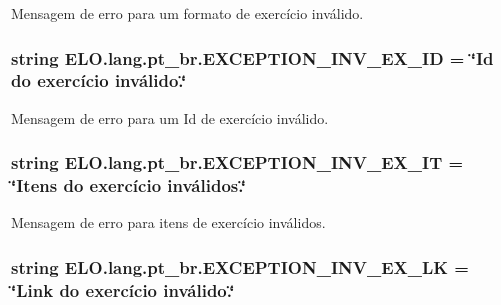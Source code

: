 Mensagem de erro para um formato de exercício inválido. 

\hypertarget{namespaceELO_1_1lang_1_1pt__br_a26cc4a6ca49a15bea42f865747e09baf}{
\subsubsection[{E\-X\-C\-E\-P\-T\-I\-O\-N\-\_\-\-I\-N\-V\-\_\-\-E\-X\-\_\-\-I\-D}]{\setlength{\rightskip}{0pt plus 5cm}string E\-L\-O.\-lang.\-pt\-\_\-br.\-E\-X\-C\-E\-P\-T\-I\-O\-N\-\_\-\-I\-N\-V\-\_\-\-E\-X\-\_\-\-I\-D = \char`\"{}Id do exercício inválido.\char`\"{}}}\label{d5/d70/namespaceELO_1_1lang_1_1pt__br_a26cc4a6ca49a15bea42f865747e09baf}


Mensagem de erro para um Id de exercício inválido. 

\hypertarget{namespaceELO_1_1lang_1_1pt__br_a4bf29d17d3f0b2efa5cfa59a17a72850}{
\subsubsection[{E\-X\-C\-E\-P\-T\-I\-O\-N\-\_\-\-I\-N\-V\-\_\-\-E\-X\-\_\-\-I\-T}]{\setlength{\rightskip}{0pt plus 5cm}string E\-L\-O.\-lang.\-pt\-\_\-br.\-E\-X\-C\-E\-P\-T\-I\-O\-N\-\_\-\-I\-N\-V\-\_\-\-E\-X\-\_\-\-I\-T = \char`\"{}Itens do exercício inválidos.\char`\"{}}}\label{d5/d70/namespaceELO_1_1lang_1_1pt__br_a4bf29d17d3f0b2efa5cfa59a17a72850}


Mensagem de erro para itens de exercício inválidos. 

\hypertarget{namespaceELO_1_1lang_1_1pt__br_a9b39683aa5ba44aa338ad65b77c7fb2b}{
\subsubsection[{E\-X\-C\-E\-P\-T\-I\-O\-N\-\_\-\-I\-N\-V\-\_\-\-E\-X\-\_\-\-L\-K}]{\setlength{\rightskip}{0pt plus 5cm}string E\-L\-O.\-lang.\-pt\-\_\-br.\-E\-X\-C\-E\-P\-T\-I\-O\-N\-\_\-\-I\-N\-V\-\_\-\-E\-X\-\_\-\-L\-K = \char`\"{}Link do exercício inválido.\char`\"{}}}\label{d5/d70/namespaceELO_1_1lang_1_1pt__br_a9b39683aa5ba44aa338ad65b77c7fb2b}



